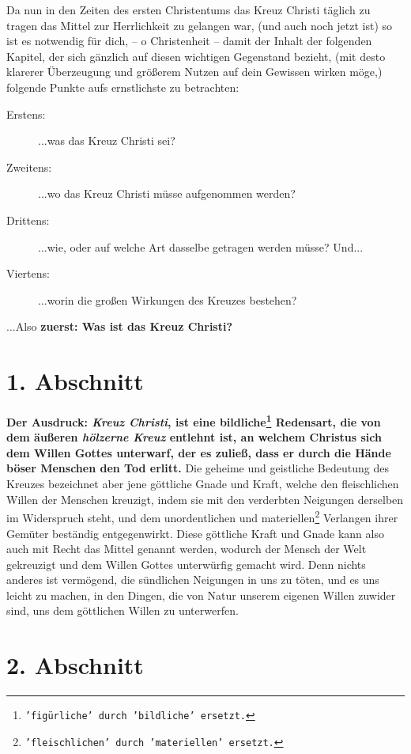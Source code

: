 \newpage

Da nun in den Zeiten des ersten Christentums das Kreuz Christi täglich zu
tragen das Mittel zur Herrlichkeit zu gelangen war, (und auch noch jetzt ist)
so ist es notwendig für dich, -- o Christenheit -- damit der Inhalt der
folgenden
Kapitel, der sich gänzlich auf diesen wichtigen Gegenstand bezieht, (mit desto
klarerer Überzeugung und größerem Nutzen auf dein Gewissen wirken möge,)
folgende Punkte aufs ernstlichste zu betrachten:
\begin{description}
\item[Erstens:] ...was das Kreuz Christi sei?
\item[Zweitens:] ...wo das Kreuz Christi müsse aufgenommen werden?
\item[Drittens:] ...wie, oder auf welche Art dasselbe getragen werden müsse?
Und...
\item[Viertens:] ...worin die großen Wirkungen des Kreuzes bestehen?
\end{description}

...Also \textbf{zuerst: Was ist das Kreuz Christi?}


\section{1. Abschnitt} \label{kap3_ab1}

\label{ref:03_01_das_kreuz}
\textbf{Der Ausdruck: \textit{Kreuz Christi}, ist eine
bildliche\footnote{\texttt{'figürliche' durch 'bildliche' ersetzt.}} Redensart,
die von dem äußeren
\textit{hölzerne Kreuz} entlehnt ist, an welchem
 Christus sich dem Willen Gottes
unterwarf, der es zuließ, dass er durch die Hände böser Menschen den Tod
erlitt.}
Die geheime und geistliche Bedeutung des Kreuzes bezeichnet aber jene göttliche
Gnade und Kraft, welche den fleischlichen Willen der Menschen kreuzigt, indem
sie mit den verderbten Neigungen derselben im Widerspruch steht, und dem
unordentlichen und materiellen\footnote{\texttt{'fleischlichen' durch
'materiellen' ersetzt.}} Verlangen ihrer Gemüter beständig
entgegenwirkt. Diese göttliche Kraft und Gnade kann also auch mit Recht das
Mittel genannt werden, wodurch der Mensch der Welt gekreuzigt und dem Willen
Gottes unterwürfig gemacht wird. Denn nichts anderes ist vermögend, die
sündlichen Neigungen in uns zu töten, und es uns leicht zu machen, in den
Dingen, die von Natur unserem eigenen Willen zuwider sind, uns dem göttlichen
Willen zu unterwerfen.

\section{2. Abschnitt} \label{kap3_ab2}

